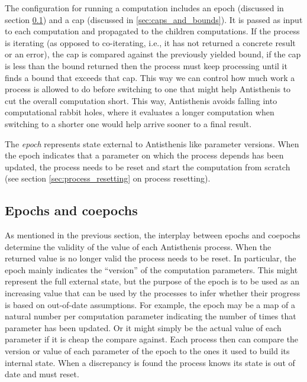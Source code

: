 The configuration for running a computation includes an epoch
(discussed in section \ref{sec:epochs_coepochs}) and a cap (discussed
in \ref{sec:caps_and_bounds}). It is passed as input to each
computation and propagated to the children computations. If the process
is iterating (as opposed to co-iterating, i.e., it has not returned a
concrete result or an error), the cap is compared against the previously
yielded bound, if the cap is less than the bound returned then the
process must keep processing until it finds a bound that exceeds that
cap. This way we can control how much work a process is allowed to do
before switching to one that might help Antisthenis to cut the overall
computation short. This way, Antisthenis avoids falling into
computational rabbit holes, where it evaluates a longer computation when
switching to a shorter one would help arrive sooner to a final result.

The \emph{epoch} represents state external to Antisthenis like
parameter versions. When the epoch indicates that a parameter on which
the process depends has been updated, the process needs to be reset
and start the computation from scratch (see section
\ref{sec:process_resetting} on process resetting).


\subsection{Epochs and coepochs}
\label{sec:epochs_coepochs}

As mentioned in the previous section, the interplay between epochs and
coepochs determine the validity of the value of each Antisthenis
process. When the returned value is no longer valid the process needs
to be reset. In particular, the epoch mainly indicates the ``version''
of the computation parameters. This might represent the full external
state, but the purpose of the epoch is to be used as an increasing
value that can be used by the processes to infer whether their
progress is based on out-of-date assumptions. For example, the epoch
may be a map of a natural number per computation parameter indicating
the number of times that parameter has been updated. Or it might
simply be the actual value of each parameter if it is cheap the
compare against. Each process then can compare the version or value of
each parameter of the epoch to the ones it used to build its internal
state. When a discrepancy is found the process knows its state is out
of date and must reset.

